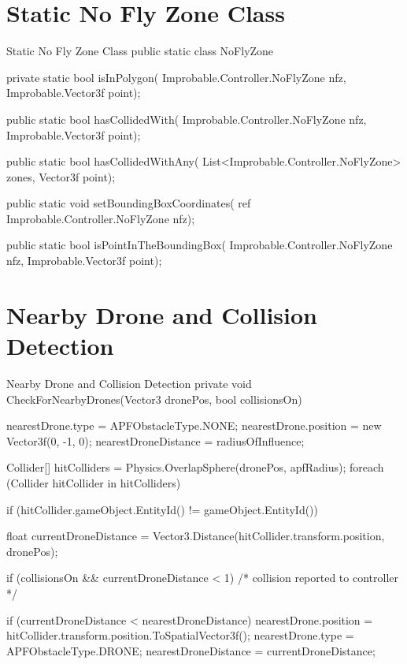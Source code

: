 \documentclass[a4paper,12pt,titlepage]{article}
\begin{document}
\newpage
{}

\printbibliography

\begin{appendices}

\section{Static No Fly Zone Class}
\begin{sexylisting}[colback=white]{Static No Fly Zone Class}
public static class NoFlyZone
{
    private static bool isInPolygon(
      Improbable.Controller.NoFlyZone nfz,
      Improbable.Vector3f point);

    public static bool hasCollidedWith(
      Improbable.Controller.NoFlyZone nfz,
      Improbable.Vector3f point);

    public static bool hasCollidedWithAny(
      List<Improbable.Controller.NoFlyZone> zones,
      Vector3f point);

    public static void setBoundingBoxCoordinates(
      ref Improbable.Controller.NoFlyZone nfz);

    public static bool isPointInTheBoundingBox(
      Improbable.Controller.NoFlyZone nfz,
      Improbable.Vector3f point);
}
\end{sexylisting}

\section{Nearby Drone and Collision Detection}
\begin{sexylisting}[colback=white]{Nearby Drone and Collision Detection}
private void CheckForNearbyDrones(Vector3 dronePos, bool collisionsOn)
{
  nearestDrone.type = APFObstacleType.NONE;
  nearestDrone.position = new Vector3f(0, -1, 0);
  nearestDroneDistance = radiusOfInfluence;

  Collider[] hitColliders = Physics.OverlapSphere(dronePos, apfRadius);
  foreach (Collider hitCollider in hitColliders)
  {
    if (hitCollider.gameObject.EntityId() != gameObject.EntityId())
    {
      float currentDroneDistance
        = Vector3.Distance(hitCollider.transform.position, dronePos);

      if (collisionsOn && currentDroneDistance < 1)
      {
        /* collision reported to controller */
      }

      if (currentDroneDistance < nearestDroneDistance)
      {
        nearestDrone.position
          = hitCollider.transform.position.ToSpatialVector3f();
        nearestDrone.type = APFObstacleType.DRONE;
        nearestDroneDistance = currentDroneDistance;
      }
    }
  }
}
\end{sexylisting}


\end{appendices}
\end{document}
